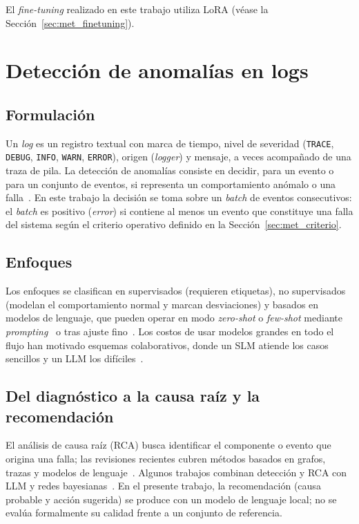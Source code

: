 El \textit{fine-tuning} realizado en este trabajo utiliza LoRA (véase la Sección~\ref{sec:met_finetuning}).

\section{Detección de anomalías en logs}\label{sec:mt_anomalias}

\subsection{Formulación}

Un \textit{log} es un registro textual con marca de tiempo, nivel de severidad (\texttt{TRACE}, \texttt{DEBUG}, \texttt{INFO}, \texttt{WARN}, \texttt{ERROR}), origen (\textit{logger}) y mensaje, a veces acompañado de una traza de pila. La detección de anomalías consiste en decidir, para un evento o para un conjunto de eventos, si representa un comportamiento anómalo o una falla~\cite{he2021_survey}. En este trabajo la decisión se toma sobre un \textit{batch} de eventos consecutivos: el \textit{batch} es positivo (\emph{error}) si contiene al menos un evento que constituye una falla del sistema según el criterio operativo definido en la Sección~\ref{sec:met_criterio}.

\subsection{Enfoques}

Los enfoques se clasifican en supervisados (requieren etiquetas), no supervisados (modelan el comportamiento normal y marcan desviaciones) y basados en modelos de lenguaje, que pueden operar en modo \textit{zero-shot} o \textit{few-shot} mediante \textit{prompting}~\cite{liu2024_logprompt, karlsen2024_benchmark} o tras ajuste fino~\cite{lim2025_logadreft, liu2025_lineadapter}. Los costos de usar modelos grandes en todo el flujo han motivado esquemas colaborativos, donde un SLM atiende los casos sencillos y un LLM los difíciles~\cite{ma2026_adaptivelog}.

\subsection{Del diagnóstico a la causa raíz y la recomendación}

El análisis de causa raíz (RCA) busca identificar el componente o evento que origina una falla; las revisiones recientes cubren métodos basados en grafos, trazas y modelos de lenguaje~\cite{wang2024_rca}. Algunos trabajos combinan detección y RCA con LLM y redes bayesianas~\cite{pedroso2025_maia}. En el presente trabajo, la recomendación (causa probable y acción sugerida) se produce con un modelo de lenguaje local; no se evalúa formalmente su calidad frente a un conjunto de referencia.

